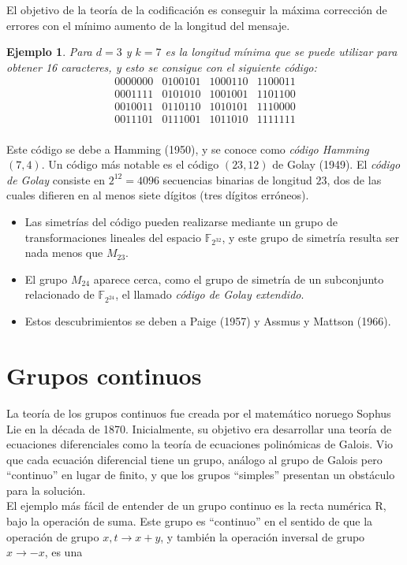 \documentclass{article}
\numberwithin{equation}{section}
\theoremstyle{plain}  %
\newtheorem{Ej}{Ejemplo}[section]
\begin{document}
El objetivo de la teoría de la codificación es conseguir la máxima corrección de errores con el mínimo aumento de la longitud del mensaje.\newline
\begin{Ej}
    Para $d = 3$ y $k = 7$ es la longitud mínima que se puede utilizar para obtener 16 caracteres, y esto se consigue con el siguiente código: 
\begin{equation*}
\begin{matrix}
0000000 & 0100101 & 1000110 & 1100011 \\
0001111 & 0101010 & 1001001 & 1101100 \\
0010011 & 0110110 & 1010101 & 1110000 \\
0011101 & 0111001 & 1011010 & 1111111 \\
\end{matrix} 
\end{equation*}
\end{Ej}
Este código se debe a Hamming (1950), y se conoce como \textit{código Hamming} $(7, 4)$. Un código más notable es el código $(23, 12)$ de Golay (1949). El \textit{código de Golay} consiste en $2^{12} = 4096$ secuencias binarias de longitud $23$, dos de las cuales difieren en al menos siete dígitos (tres dígitos erróneos). 
\begin{itemize}
    \item<1-> Las simetrías del código pueden realizarse mediante un grupo de transformaciones lineales del espacio $\mathbb{F}_{2^{32}}$, y este grupo de simetría resulta ser nada menos que $M_{23}$.\newline
    
    \item<2-> El grupo $M_{24}$ aparece cerca, como el grupo de simetría de un subconjunto relacionado de $\mathbb{F}_{2^{24}}$, el llamado \textit{código de Golay extendido}.\newline
    
    \item<3-> Estos descubrimientos se deben a Paige (1957) y Assmus y Mattson (1966). 
\end{itemize}
\section{Grupos continuos}
La teoría de los grupos continuos fue creada por el matemático noruego Sophus Lie en la 
década de 1870. Inicialmente, su objetivo era desarrollar una teoría de ecuaciones
diferenciales como la teoría de ecuaciones polinómicas de Galois. Vio que cada 
ecuación diferencial tiene un grupo, análogo al grupo de Galois pero “continuo”
en lugar de finito, y que los grupos “simples” presentan un obstáculo para la 
solución. 
\\ 
El ejemplo más fácil de entender de un grupo continuo es la recta numérica R, bajo 
la operación de suma. Este grupo es “continuo” en el sentido de que la operación de grupo $x , t \to x+y$, y también la operación inversal de grupo $x \to -x$, es una 
\end{document}
